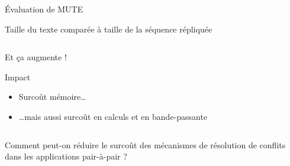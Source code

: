 \begin{frame}{Évaluation de MUTE}
\begin{block}{Taille du texte comparée à taille de la séquence répliquée}
\begin{columns}
\begin{column}{0.4\textwidth}
\begin{center}
                    \alert{Et ça augmente !}
                \end{center}
                \pause
                \begin{block}{Impact}
                    \begin{itemize}
                        \item Surcoût \alert{mémoire}\dots
                        \item \dots mais aussi surcoût en \alert{calculs} et en \alert{bande-passante}
                    \end{itemize}
                \end{block}
            \end{column}
        \end{columns}
    \end{block}
\end{frame}

\begin{frame}[standout]
    Comment peut-on \alert{réduire le surcoût} des mécanismes de résolution de conflits dans les applications pair-à-pair ?
\end{frame}

